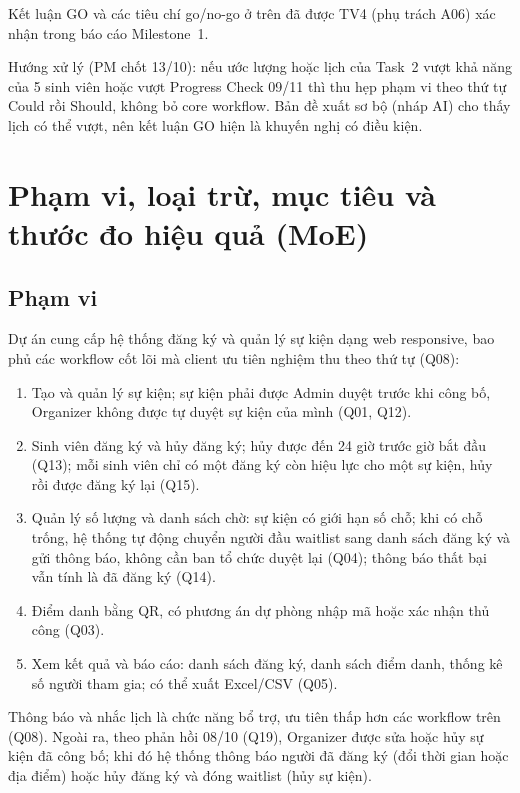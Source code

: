 Kết luận GO và các tiêu chí go/no-go ở trên đã được TV4 (phụ trách A06) xác nhận trong báo cáo Milestone~1.

Hướng xử lý (PM chốt 13/10): nếu ước lượng hoặc lịch của Task~2 vượt khả năng của 5 sinh viên hoặc vượt Progress Check 09/11 thì thu hẹp phạm vi theo thứ tự Could rồi Should, không bỏ core workflow. Bản đề xuất sơ bộ (nháp AI) cho thấy lịch có thể vượt, nên kết luận GO hiện là khuyến nghị có điều kiện.

\section{Phạm vi, loại trừ, mục tiêu và thước đo hiệu quả (MoE)}
\label{sec:1-4}

\subsection*{Phạm vi}
Dự án cung cấp hệ thống đăng ký và quản lý sự kiện dạng web responsive, bao phủ các workflow cốt lõi mà client ưu tiên nghiệm thu theo thứ tự (Q08):
\begin{enumerate}
  \item Tạo và quản lý sự kiện; sự kiện phải được Admin duyệt trước khi công bố, Organizer không được tự duyệt sự kiện của mình (Q01, Q12).
  \item Sinh viên đăng ký và hủy đăng ký; hủy được đến 24 giờ trước giờ bắt đầu (Q13); mỗi sinh viên chỉ có một đăng ký còn hiệu lực cho một sự kiện, hủy rồi được đăng ký lại (Q15).
  \item Quản lý số lượng và danh sách chờ: sự kiện có giới hạn số chỗ; khi có chỗ trống, hệ thống tự động chuyển người đầu waitlist sang danh sách đăng ký và gửi thông báo, không cần ban tổ chức duyệt lại (Q04); thông báo thất bại vẫn tính là đã đăng ký (Q14).
  \item Điểm danh bằng QR, có phương án dự phòng nhập mã hoặc xác nhận thủ công (Q03).
  \item Xem kết quả và báo cáo: danh sách đăng ký, danh sách điểm danh, thống kê số người tham gia; có thể xuất Excel/CSV (Q05).
\end{enumerate}
Thông báo và nhắc lịch là chức năng bổ trợ, ưu tiên thấp hơn các workflow trên (Q08). Ngoài ra, theo phản hồi 08/10 (Q19), Organizer được sửa hoặc hủy sự kiện đã công bố; khi đó hệ thống thông báo người đã đăng ký (đổi thời gian hoặc địa điểm) hoặc hủy đăng ký và đóng waitlist (hủy sự kiện).

